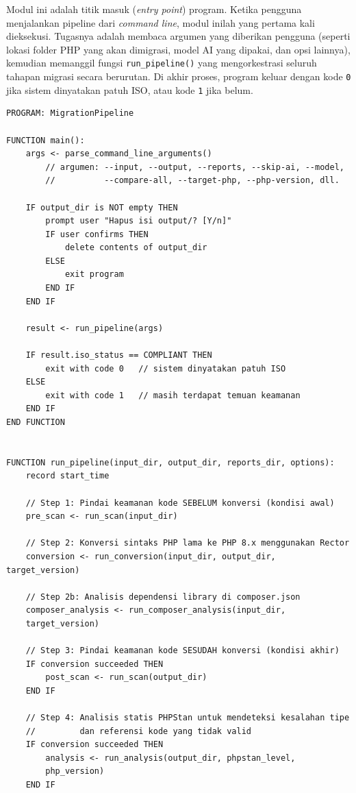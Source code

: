 Modul ini adalah titik masuk (\textit{entry point}) program. Ketika pengguna
menjalankan pipeline dari \textit{command line}, modul inilah yang pertama kali
dieksekusi. Tugasnya adalah membaca argumen yang diberikan pengguna (seperti
lokasi folder PHP yang akan dimigrasi, model AI yang dipakai, dan opsi lainnya),
kemudian memanggil fungsi \texttt{run\_pipeline()} yang mengorkestrasi seluruh
tahapan migrasi secara berurutan. Di akhir proses, program keluar dengan kode
\texttt{0} jika sistem dinyatakan patuh ISO, atau kode \texttt{1} jika belum.

\begin{lstlisting}[style=pseudocodestyle]
PROGRAM: MigrationPipeline

FUNCTION main():
    args <- parse_command_line_arguments()
        // argumen: --input, --output, --reports, --skip-ai, --model,
        //          --compare-all, --target-php, --php-version, dll.

    IF output_dir is NOT empty THEN
        prompt user "Hapus isi output/? [Y/n]"
        IF user confirms THEN
            delete contents of output_dir
        ELSE
            exit program
        END IF
    END IF

    result <- run_pipeline(args)

    IF result.iso_status == COMPLIANT THEN
        exit with code 0   // sistem dinyatakan patuh ISO
    ELSE
        exit with code 1   // masih terdapat temuan keamanan
    END IF
END FUNCTION


FUNCTION run_pipeline(input_dir, output_dir, reports_dir, options):
    record start_time

    // Step 1: Pindai keamanan kode SEBELUM konversi (kondisi awal)
    pre_scan <- run_scan(input_dir)

    // Step 2: Konversi sintaks PHP lama ke PHP 8.x menggunakan Rector
    conversion <- run_conversion(input_dir, output_dir, target_version)

    // Step 2b: Analisis dependensi library di composer.json
    composer_analysis <- run_composer_analysis(input_dir, 
    target_version)

    // Step 3: Pindai keamanan kode SESUDAH konversi (kondisi akhir)
    IF conversion succeeded THEN
        post_scan <- run_scan(output_dir)
    END IF

    // Step 4: Analisis statis PHPStan untuk mendeteksi kesalahan tipe
    //         dan referensi kode yang tidak valid
    IF conversion succeeded THEN
        analysis <- run_analysis(output_dir, phpstan_level, 
        php_version)
    END IF


\end{lstlisting}
